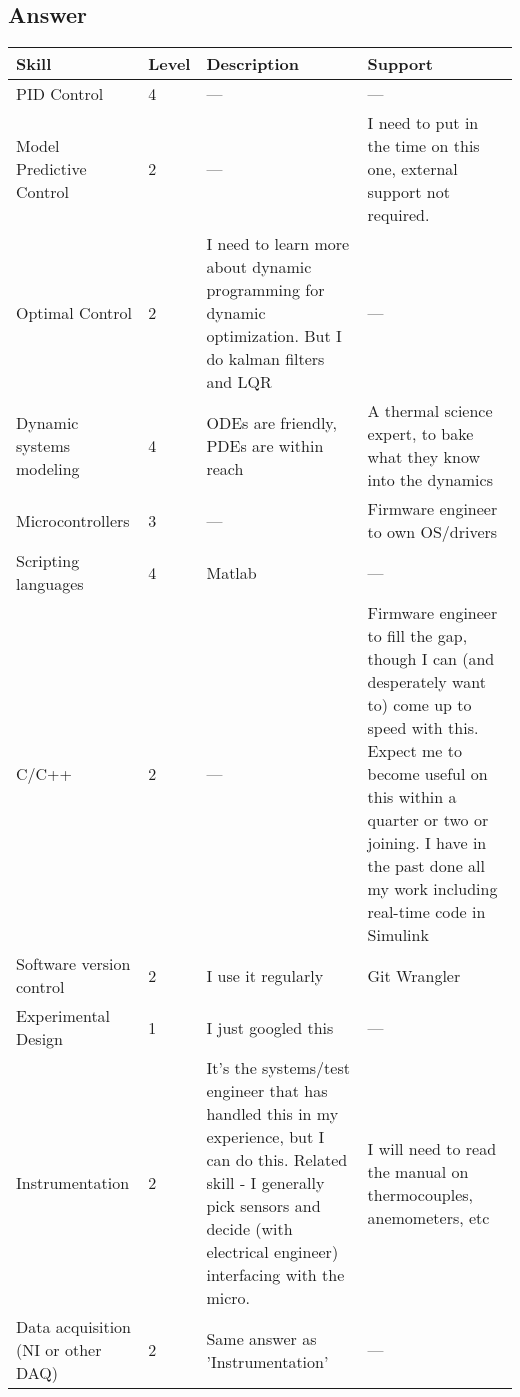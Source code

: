 \subsection *{Answer}
\begin{center}
\begin{tabularx}{\textwidth}{X l X X}
\hline
	Skill &
	Level & 
	Description & 
	Support 
	\\ [0.5ex] 
\hline\hline
	PID Control & 
	4 & 
	--- & 
	--- \\
\hline
	Model Predictive Control & 
	2 &
	--- & 
	I need to put in the time on this one, external support not required. \\
\hline
	Optimal Control & 
	2 & 
	I need to learn more about dynamic programming for dynamic optimization. But I do kalman filters and LQR & 
	--- \\
\hline
	Dynamic systems modeling & 
	4 & 
	ODEs are friendly, PDEs are within reach & 
	A thermal science expert, to bake what they know into the dynamics \\
\hline
	Microcontrollers & 
	3 & 
	--- & 
	Firmware engineer to own OS/drivers \\
\hline
	Scripting languages & 
	4 & 
	Matlab & 
	--- \\
\hline
	C/C++ & 
	2 & 
	--- & 
	Firmware engineer to fill the gap, though I can (and desperately want to) come up to speed with this. Expect me to 	become useful on this within a quarter or two or joining. I have in the past done all my work including real-time code in Simulink \\
\hline
	Software version control & 
	2 & 
	I use it regularly & 
	Git Wrangler \\
\hline
	Experimental Design & 1 & I just googled this & --- \\
\hline
	Instrumentation & 
	2 & 
	It's the systems/test engineer that has handled this in my experience, but I can do this. Related skill - I generally pick sensors and 		decide (with electrical engineer) interfacing with the micro. & 
	I will need to read the manual on thermocouples, anemometers, etc \\
\hline
	Data acquisition (NI or other DAQ) & 
	2 & 
	Same answer as 'Instrumentation' & 
	--- \\
\hline
\end{tabularx}


\end{center}
